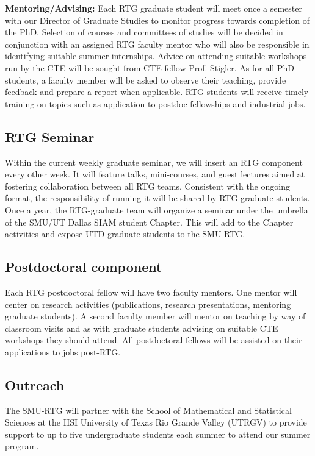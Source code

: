 \documentclass[11pt]{article}
\begin{document}
\textbf{Mentoring/Advising:} Each RTG graduate student will meet once a semester with our Director of Graduate
Studies to monitor progress towards completion of the PhD. Selection of courses and committees of studies
will be decided in conjunction with an assigned RTG faculty mentor who will also be responsible in identifying
suitable summer internships. Advice on attending suitable workshops run by the CTE will be sought
from CTE fellow Prof. Stigler. As for all PhD students, a faculty member will be asked to observe their
teaching, provide feedback and prepare a report when applicable. RTG students will receive timely training
on topics such as application to postdoc fellowships and industrial jobs.
 

\subsection{RTG Seminar}
Within the current weekly graduate seminar, we will insert an RTG component every other week. It
will feature talks, mini-courses, and guest lectures aimed at fostering collaboration between all RTG teams.
Consistent with the ongoing format, the responsibility of running it will be shared by RTG graduate students.
Once a year, the RTG-graduate team will organize a seminar under the umbrella of the SMU/UT Dallas
SIAM student Chapter. This will add to the Chapter activities and expose UTD graduate students to the
SMU-RTG.

\subsection{Postdoctoral component}
Each RTG postdoctoral fellow will have two faculty mentors. One mentor will center on research activities
(publications, research presentations, mentoring graduate students). A second faculty member will
mentor on teaching by way of classroom visits and as with graduate students advising on suitable CTE workshops
they should attend. All postdoctoral fellows will be assisted on their applications to jobs post-RTG.

\subsection{Outreach}
The SMU-RTG will partner with the School of Mathematical and Statistical Sciences at the HSI University
of Texas Rio Grande Valley (UTRGV) to provide support to up to five undergraduate students each
summer to attend our summer program.
   
\end{document}
